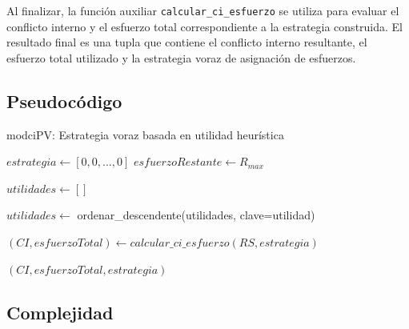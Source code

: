 \documentclass[11pt,letter]{article}
\begin{document}
Al finalizar, la función auxiliar \texttt{calcular\_ci\_esfuerzo} se utiliza para evaluar el conflicto interno y el esfuerzo total correspondiente a la estrategia construida. El resultado final es una tupla que contiene el conflicto interno resultante, el esfuerzo total utilizado y la estrategia voraz de asignación de esfuerzos.

\subsection{Pseudocódigo}
\begin{algorithm}[H]
\caption{modciPV: Estrategia voraz basada en utilidad heurística}

$estrategia \leftarrow [0, 0, \ldots, 0]$ 
$esfuerzoRestante \leftarrow R_{max}$

$utilidades \leftarrow []$ 


$utilidades \leftarrow$ ordenar\_descendente(utilidades, clave=utilidad)


$(CI, esfuerzoTotal) \leftarrow calcular\_ci\_esfuerzo(RS, estrategia)$

\Return $(CI, esfuerzoTotal, estrategia)$
\end{algorithm}
\subsection{Complejidad}
\end{document}
